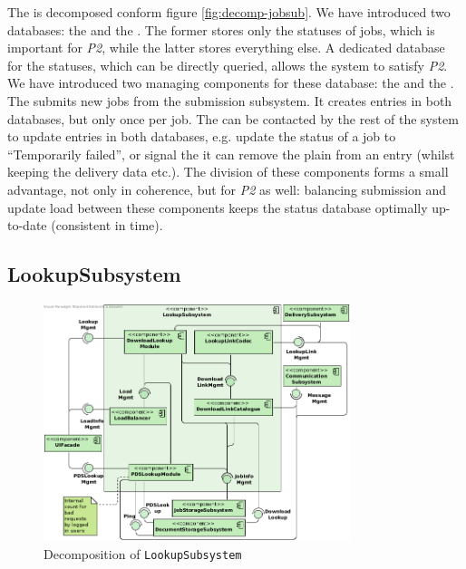 The  is decomposed conform figure \ref{fig:decomp-jobsub}. We have introduced two databases: the  and the . The former stores only the statuses of jobs, which is important for \emph{P2}, while the latter stores everything else. A dedicated database for the statuses, which can be directly queried, allows the system to satisfy \emph{P2}. We have introduced two managing components for these database: the  and the . The  submits new jobs from the submission subsystem. It creates entries in both databases, but only once per job. The  can be contacted by the rest of the system to update entries in both databases, e.g. update the status of a job to ``Temporarily failed'', or signal the  it can remove the plain  from an entry (whilst keeping the delivery data etc.). The division of these components forms a small advantage, not only in coherence, but for \emph{P2} as well: balancing submission and update load between these components keeps the status database optimally up-to-date (consistent in time).

\subsection{LookupSubsystem}
\begin{figure}[!htp]
    \centering
    \includegraphics[width=0.8\textwidth]{figures/Lookup Subsystem.png}
    \caption{Decomposition of \texttt{LookupSubsystem}}\label{fig:decomp-lookupsub}
\end{figure}

